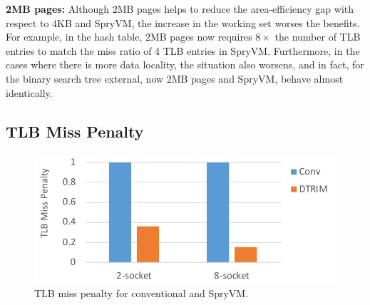 \noindent\textbf{2MB pages:} Although $2$MB pages helps to reduce the area-efficiency gap with respect to $4$KB and SpryVM, the increase in the working set worses the benefits. For example, in the hash table, $2$MB pages now requires $8\times$ the number of TLB entries to match the miss ratio of 4 TLB entries in SpryVM. Furthermore, in the cases where there is more data locality, the situation also worsens, and in fact, for the binary search tree external, now $2$MB pages and SpryVM, behave almost identically.

\subsection{TLB Miss Penalty}

\begin{figure}[t]
	\centering
	\includegraphics[width=1.0\columnwidth]{graphs/penalty.pdf}
	\caption{TLB miss penalty for conventional and SpryVM.}
	\label{fig:pagewalks}
\end{figure}
